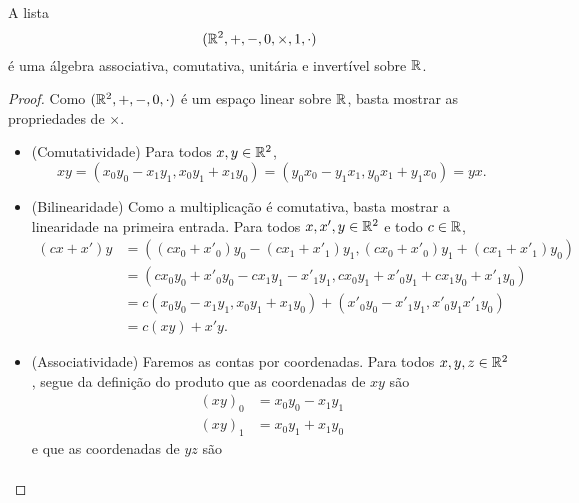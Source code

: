 \begin{proposition}
A lista
	\begin{equation*}
	(\mathbb{R}^2,+,-,0,\times,1,\cdot)
	\end{equation*}
é uma álgebra associativa, comutativa, unitária e invertível sobre $\mathbb{R}$.
\end{proposition}
\begin{proof}
Como $(\mathbb{R}^2,+,-,0,\cdot)$ é um espaço linear sobre $\mathbb{R}$, basta mostrar as propriedades de $\times$.
\begin{itemize}
	\item (Comutatividade) Para todos $x,y \in \mathbb{R}^2$,
		\begin{equation*}
		xy = (x_0y_0-x_1y_1,x_0y_1+x_1y_0) = (y_0x_0-y_1x_1,y_0x_1+y_1x_0) = yx.
		\end{equation*}
	\item (Bilinearidade) Como a multiplicação é comutativa, basta mostrar a linearidade na primeira entrada. Para todos $x,x',y \in \mathbb{R}^2$ e todo $c \in \mathbb{R}$,
		\begin{align*}
		(cx+x')y &= ((cx_0+x'_0)y_0-(cx_1+x'_1)y_1,(cx_0+x'_0)y_1+(cx_1+x'_1)y_0) \\
			&= (cx_0y_0+x'_0y_0-cx_1y_1-x'_1y_1,cx_0y_1+x'_0y_1+cx_1y_0+x'_1y_0) \\
			&= c(x_0y_0-x_1y_1,x_0y_1+x_1y_0) + (x'_0y_0-x'_1y_1,x'_0y_1x'_1y_0) \\
			&= c(xy) + x'y.
		\end{align*}
	\item %
	(Associatividade) Faremos as contas por coordenadas. Para todos $x,y,z \in \mathbb{R}^2$, segue da definição do produto que as coordenadas de $xy$ são
		\begin{align*}
		(xy)_0 &= x_0y_0 - x_1y_1 \\
		(xy)_1 &= x_0y_1 + x_1y_0
		\end{align*}
	e que as coordenadas de $yz$ são
		\begin{align*}

\end{align*}
\end{itemize}
\end{proof}
